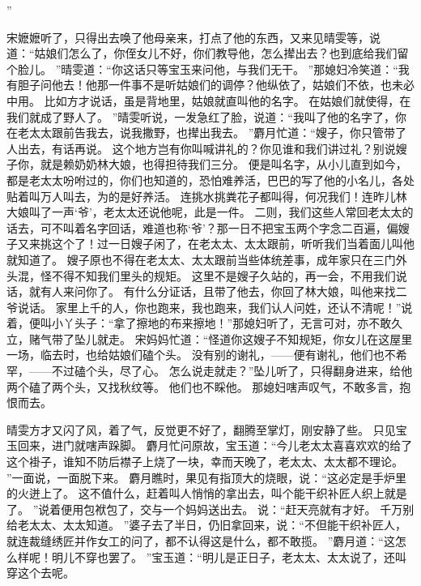 ”\par
宋嬷嬷听了，只得出去唤了他母亲来，打点了他的东西，又来见晴雯等，说道：“姑娘们怎么了，你侄女儿不好，你们教导他，怎么撵出去？也到底给我们留个脸儿。
”晴雯道：“你这话只等宝玉来问他，与我们无干。
”那媳妇冷笑道：“我有胆子问他去！他那一件事不是听姑娘们的调停？他纵依了，姑娘们不依，也未必中用。
比如方才说话，虽是背地里，姑娘就直叫他的名字。
在姑娘们就使得，在我们就成了野人了。
”晴雯听说，一发急红了脸，说道：“我叫了他的名字了，你在老太太跟前告我去，说我撒野，也撵出我去。
”麝月忙道：“嫂子，你只管带了人出去，有话再说。
这个地方岂有你叫喊讲礼的？你见谁和我们讲过礼？别说嫂子你，就是赖奶奶林大娘，也得担待我们三分。
便是叫名字，从小儿直到如今，都是老太太吩咐过的，你们也知道的，恐怕难养活，巴巴的写了他的小名儿，各处贴着叫万人叫去，为的是好养活。
连挑水挑粪花子都叫得，何况我们！连昨儿林大娘叫了一声‘爷’，老太太还说他呢，此是一件。
二则，我们这些人常回老太太的话去，可不叫着名字回话，难道也称‘爷’？那一日不把宝玉两个字念二百遍，偏嫂子又来挑这个了！过一日嫂子闲了，在老太太、太太跟前，听听我们当着面儿叫他就知道了。
嫂子原也不得在老太太、太太跟前当些体统差事，成年家只在三门外头混，怪不得不知我们里头的规矩。
这里不是嫂子久站的，再一会，不用我们说话，就有人来问你了。
有什么分证话，且带了他去，你回了林大娘，叫他来找二爷说话。
家里上千的人，你也跑来，我也跑来，我们认人问姓，还认不清呢！”说着，便叫小丫头子：“拿了擦地的布来擦地！”那媳妇听了，无言可对，亦不敢久立，赌气带了坠儿就走。
宋妈妈忙道：“怪道你这嫂子不知规矩，你女儿在这屋里一场，临去时，也给姑娘们磕个头。
没有别的谢礼，——便有谢礼，他们也不希罕，——不过磕个头，尽了心。
怎么说走就走？”坠儿听了，只得翻身进来，给他两个磕了两个头，又找秋纹等。
他们也不睬他。
那媳妇嗐声叹气，不敢多言，抱恨而去。
\par
晴雯方才又闪了风，着了气，反觉更不好了，翻腾至掌灯，刚安静了些。
只见宝玉回来，进门就嗐声跺脚。
麝月忙问原故，宝玉道：“今儿老太太喜喜欢欢的给了这个褂子，谁知不防后襟子上烧了一块，幸而天晚了，老太太、太太都不理论。
”一面说，一面脱下来。
麝月瞧时，果见有指顶大的烧眼，说：“这必定是手炉里的火迸上了。
这不值什么，赶着叫人悄悄的拿出去，叫个能干织补匠人织上就是了。
”说着便用包袱包了，交与一个妈妈送出去。
说：“赶天亮就有才好。
千万别给老太太、太太知道。
”婆子去了半日，仍旧拿回来，说：“不但能干织补匠人，就连裁缝绣匠并作女工的问了，都不认得这是什么，都不敢揽。
”麝月道：“这怎么样呢！明儿不穿也罢了。
”宝玉道：“明儿是正日子，老太太、太太说了，还叫穿这个去呢。
